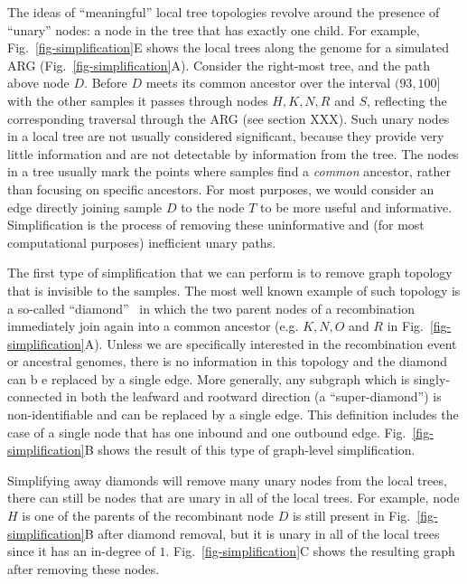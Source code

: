 \documentclass{article}
\begin{document}
The ideas of ``meaningful'' local tree topologies revolve around the
presence of ``unary'' nodes: a node in the tree that has exactly
one child. For example, Fig.~\ref{fig-simplification}E shows the
local trees along the genome for a simulated ARG
(Fig.~\ref{fig-simplification}A). Consider the right-most tree,
and the path above node $D$. Before $D$ meets its common ancestor
over the interval $(93, 100]$ with the other samples it passes through
nodes $H, K, N, R$ and $S$, reflecting the corresponding
traversal through the ARG (see section XXX). Such unary nodes
in a local tree are not usually considered significant,
because they provide very little information and are not
detectable by information from the tree. %
The nodes in a tree usually mark the points where samples find a
\emph{common} ancestor, rather than focusing on specific
ancestors. For most purposes, we would consider an edge
directly joining sample $D$ to the node $T$ to be more
useful and informative. Simplification is the process of removing
these uninformative and (for most computational purposes)
inefficient unary paths.

The first type of simplification that we can perform is to remove
graph topology that is invisible to the samples. The most well
known example of such topology is a so-called
``diamond''~\citep{rasmussen2014genome}
in which the two parent nodes of a recombination immediately
join again into a common ancestor (e.g. $K,N,O$ and $R$ in
Fig.~\ref{fig-simplification}A).
Unless we are specifically
interested in the recombination event or ancestral genomes,
there is no information in this topology and the diamond can b
e replaced by a single edge. More generally, any
subgraph which is singly-connected in both the leafward and
rootward direction (a ``super-diamond'') is non-identifiable and can be
replaced by a single edge. This definition includes the case
of a single node that has one inbound and one outbound edge.
Fig.~\ref{fig-simplification}B shows the result of this type of
graph-level simplification.

Simplifying away diamonds will remove many unary nodes from the
local trees, there can still be nodes that are unary in all
of the local trees. For example, node $H$ is one of the
parents of the recombinant node $D$ is still present in
Fig.~\ref{fig-simplification}B after diamond removal, but
it is unary in all of the local trees since it has an
in-degree of $1$.
Fig.~\ref{fig-simplification}C shows the resulting graph
after removing these nodes.
\end{document}
